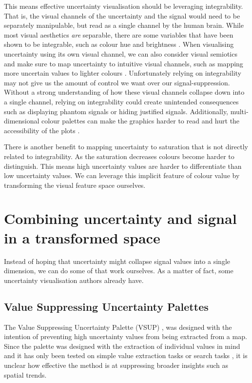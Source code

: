\documentclass[
  12pt]{article}
\begin{document}
This means effective uncertainty visualisation should be leveraging
integrability. That is, the visual channels of the uncertainty and the
signal would need to be separately manipulable, but read as a single
channel by the human brain. While most visual aesthetics \emph{are}
separable, there are some variables that have been shown to be
integrable, such as colour hue and brightness \citep{Vanderplas2020}.
When visualising uncertainty using its own visual channel, we can also
consider visual semiotics and make sure to map uncertainty to intuitive
visual channels, such as mapping more uncertain values to lighter
colours \citep{Maceachren2012}. Unfortunately relying on integrability
may not give us the amount of control we want over our
signal-suppression. Without a strong understanding of how these visual
channels collapse down into a single channel, relying on integrability
could create unintended consequences such as displaying phantom signals
or hiding justified signals. Additionally, multi-dimensional colour
palettes can make the graphics harder to read and hurt the accessibility
of the plots \citep{Vanderplas2015}.

There is another benefit to mapping uncertainty to saturation that is
not directly related to integrability. As the saturation decreases
colours become harder to distinguish. This means high uncertainty values
are harder to differentiate than low uncertainty values. We can leverage
this implicit feature of colour value by transforming the visual feature
space ourselves.

\section{Combining uncertainty and signal in a transformed
space}\label{combining-uncertainty-and-signal-in-a-transformed-space}

Instead of hoping that uncertainty might collapse signal values into a
single dimension, we can do some of that work ourselves. As a matter of
fact, some uncertainty visualisation authors already have.

\subsection{Value Suppressing Uncertainty
Palettes}\label{value-suppressing-uncertainty-palettes}

The Value Suppressing Uncertainty Palette (VSUP) \citep{Correll2018},
was designed with the intention of preventing high uncertainty values
from being extracted from a map. Since the palette was designed with the
extraction of individual values in mind and it has only been tested on
simple value extraction tasks \citep{Correll2018} or search tasks
\citep{Ndlovu2023}, it is unclear how effective the method is at
suppressing broader insights such as spatial trends.
\end{document}
